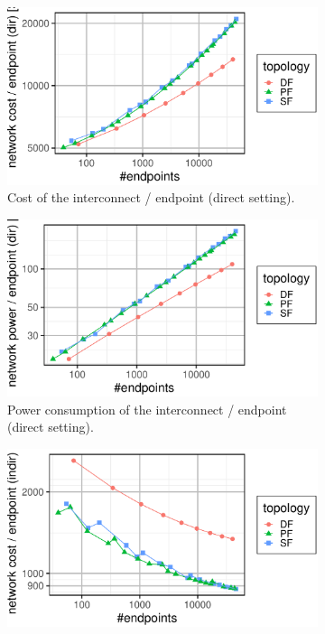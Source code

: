\begin{figure}[t]
\begin{subfigure}[t]{0.49 \textwidth}
\includegraphics[width=1.0\columnwidth]{../../../plots/plot_cost_per_endpoint_direct.pdf}
%
\caption{\textmd{Cost of the interconnect / endpoint (direct setting).}}
\label{fig:cost-total}
\end{subfigure}
\begin{subfigure}[t]{0.49 \textwidth}
\centering
\includegraphics[width=1.0\columnwidth]{../../../plots/plot_power_per_endpoint_direct.pdf}
%
\caption{\textmd{Power consumption of the interconnect / endpoint (direct setting).}}
\label{fig:power-total}
\end{subfigure}
\vspace{1em}
%
%
%
\begin{subfigure}[t]{0.49 \textwidth}
\centering
\includegraphics[width=1.0\columnwidth]{../../../plots/plot_cost_per_endpoint_indirect.pdf}

\end{subfigure}
\end{figure}

